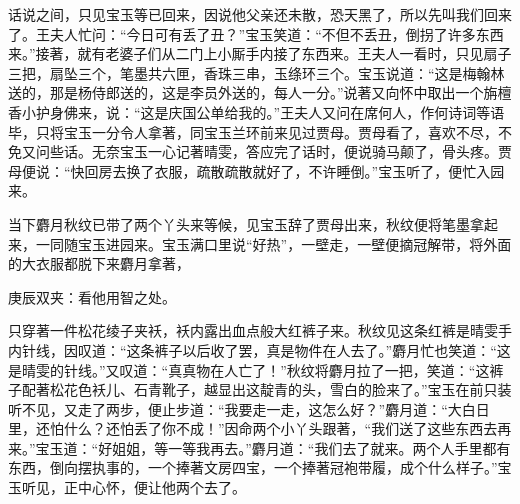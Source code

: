 \begin{parag}
    话说之间，只见宝玉等已回来，因说他父亲还未散，恐天黑了，所以先叫我们回来了。王夫人忙问：“今日可有丢了丑？”宝玉笑道：“不但不丢丑，倒拐了许多东西来。”接著，就有老婆子们从二门上小厮手内接了东西来。王夫人一看时，只见扇子三把，扇坠三个，笔墨共六匣，香珠三串，玉绦环三个。宝玉说道：“这是梅翰林送的，那是杨侍郎送的，这是李员外送的，每人一分。”说著又向怀中取出一个旃檀香小护身佛来，说：“这是庆国公单给我的。”王夫人又问在席何人，作何诗词等语毕，只将宝玉一分令人拿著，同宝玉兰环前来见过贾母。贾母看了，喜欢不尽，不免又问些话。无奈宝玉一心记著晴雯，答应完了话时，便说骑马颠了，骨头疼。贾母便说：“快回房去换了衣服，疏散疏散就好了，不许睡倒。”宝玉听了，便忙入园来。
\end{parag}


\begin{parag}
    当下麝月秋纹已带了两个丫头来等候，见宝玉辞了贾母出来，秋纹便将笔墨拿起来，一同随宝玉进园来。宝玉满口里说“好热”，一壁走，一壁便摘冠解带，将外面的大衣服都脱下来麝月拿著，\begin{note}庚辰双夹：看他用智之处。\end{note}只穿著一件松花绫子夹袄，袄内露出血点般大红裤子来。秋纹见这条红裤是晴雯手内针线，因叹道：“这条裤子以后收了罢，真是物件在人去了。”麝月忙也笑道：“这是晴雯的针线。”又叹道：“真真物在人亡了！”秋纹将麝月拉了一把，笑道：“这裤子配著松花色袄儿、石青靴子，越显出这靛青的头，雪白的脸来了。”宝玉在前只装听不见，又走了两步，便止步道：“我要走一走，这怎么好？”麝月道：“大白日里，还怕什么？还怕丢了你不成！”因命两个小丫头跟著，“我们送了这些东西去再来。”宝玉道：“好姐姐，等一等我再去。”麝月道：“我们去了就来。两个人手里都有东西，倒向摆执事的，一个捧著文房四宝，一个捧著冠袍带履，成个什么样子。”宝玉听见，正中心怀，便让他两个去了。
\end{parag}


